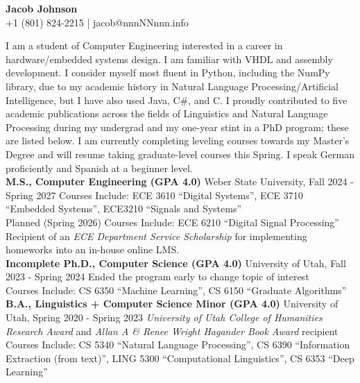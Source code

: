 \documentclass[a4paper,10pt]{article}
\newcommand{\resumeSection}[1]{\vspace{2pt}\noindent{\Large \textbf{#1}}\vspace{1pt}\newline}
\newcommand{\resumeSubsection}[2]{\noindent\textbf{#1} \hfill #2\newline}
\begin{document}
\begin{center}
    {\LARGE \textbf{Jacob Johnson}} \\
    \vspace{2pt}
    +1 (801) 824-2215  | jacob@nnnNNnnn.info
\end{center}

\resumeSection{Overview}
    \indent I am a student of Computer Engineering interested in a career in hardware/embedded systems design. I am familiar with VHDL and assembly development. I consider myself most fluent in Python, including the NumPy library, due to my academic history in Natural Language Processing/Artificial Intelligence, but I have also used Java, C\#, and C. I proudly contributed to five academic publications across the fields of Linguistics and Natural Language Processing during my undergrad and my one-year stint in a PhD program; these are listed below. I am currently completing leveling courses towards my Master's Degree and will resume taking graduate-level courses this Spring. I speak German proficiently and Spanish at a beginner level. \\


\resumeSection{Education}
    \resumeSubsection{M.S., Computer Engineering (GPA 4.0)}{Weber State University, Fall 2024 - Spring 2027}
        Courses Include: ECE 3610 ``Digital Systems'', ECE 3710 ``Embedded Systems'', ECE3210 ``Signals and Systems'' \\
        Planned (Spring 2026) Courses Include: ECE 6210 ``Digital Signal Processing''\\
        Recipient of an \textit{ECE Department Service Scholarship} for implementing homeworks into an in-house online LMS. \\
    \resumeSubsection{Incomplete Ph.D., Computer Science (GPA 4.0)}{University of Utah, Fall 2023 - Spring 2024}
        Ended the program early to change topic of interest \\
        Courses Include: CS 6350 ``Machine Learning'', CS 6150 ``Graduate Algorithms'' \\
    \resumeSubsection{B.A., Linguistics + Computer Science Minor (GPA 4.0)}{University of Utah, Spring 2020 - Spring 2023}
        \textit{University of Utah College of Humanities Research Award} and \textit{Allan A \& Renee Wright Hagander Book Award} recipient\\
        Courses Include: CS 5340 ``Natural Language Processing'', CS 6390 ``Information Extraction (from text)'', LING 5300 ``Computational Linguistics'', CS 6353 ``Deep Learning'' \\
\end{document}
